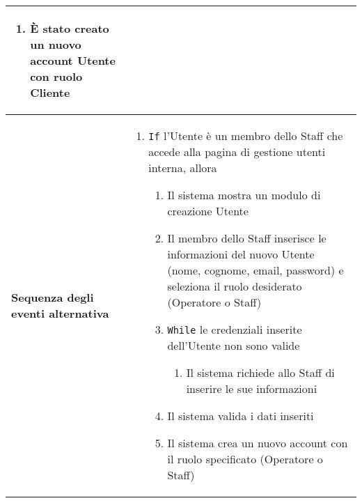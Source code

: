 \documentclass[a4paper]{report}
\begin{document}
\begin{table}[H]
\begin{tabular}{|p{3.9cm}|p{9.9cm}|}
\begin{enumerate}[leftmargin=14pt,label=\arabic*.,labelsep=0.5em,topsep=0pt,partopsep=0pt,parsep=0pt,itemsep=0pt]
\item È stato creato un nuovo account Utente con ruolo Cliente
\end{enumerate} \\ \hline
\textbf{Sequenza degli eventi alternativa} & \begin{enumerate}[leftmargin=14pt,label=\arabic*.,labelsep=0.5em,topsep=0pt,partopsep=0pt,parsep=0pt,itemsep=0pt]
    \item \texttt{If} l'Utente è un membro dello Staff che accede alla pagina di gestione utenti interna, allora
    \begin{enumerate}[label=\arabic{enumi}.\arabic*.,leftmargin=22pt,labelsep=0.5em,topsep=0pt,partopsep=0pt,parsep=0pt,itemsep=0pt]
        \item Il sistema mostra un modulo di creazione Utente
        \item Il membro dello Staff inserisce le informazioni del nuovo Utente (nome, cognome, email, password) e seleziona il ruolo desiderato (Operatore o Staff)
        \item \texttt{While} le credenziali inserite dell'Utente non sono valide
        \begin{enumerate}[label=\arabic{enumi}.\arabic*.,leftmargin=22pt,labelsep=0.5em,topsep=0pt,partopsep=0pt,parsep=0pt,itemsep=0pt]
        \item Il sistema richiede allo Staff di inserire le sue informazioni
    \end{enumerate}
        \item Il sistema valida i dati inseriti
        \item Il sistema crea un nuovo account con il ruolo specificato (Operatore o Staff)
    \end{enumerate}
\end{enumerate}\\ \hline
\end{tabular}
\end{table}
\end{document}
